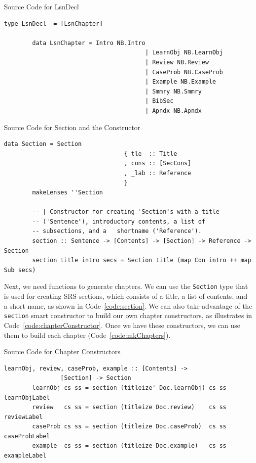 \begin{listing}[h]
	\caption{Source Code for LsnDecl}
	\label{code:LsnDecl}
	\begin{lstlisting}[language=haskell1]
		type LsnDecl  = [LsnChapter]
		
		data LsnChapter = Intro NB.Intro
										| LearnObj NB.LearnObj
										| Review NB.Review
										| CaseProb NB.CaseProb
										| Example NB.Example
										| Smmry NB.Smmry
										| BibSec
										| Apndx NB.Apndx
	\end{lstlisting}
\end{listing}

\begin{listing}[h!]
	\caption{Source Code for Section and the Constructor}
	\label{code:section}
	\begin{lstlisting}[language=haskell1]
		data Section = Section
								  { tle  :: Title
								  , cons :: [SecCons]
								  , _lab :: Reference
								  }
		makeLenses ''Section
		
		-- | Constructor for creating 'Section's with a title 
		-- ('Sentence'), introductory contents, a list of 
		-- subsections, and a	shortname ('Reference').
		section :: Sentence -> [Contents] -> [Section] -> Reference -> Section
		section title intro secs = Section title (map Con intro ++ map Sub secs)
	\end{lstlisting}
\end{listing}

Next, we need functions to generate chapters. We can use the \texttt{Section} 
type that is used for creating SRS sections, which consists of a title, a list 
of contents, and a short name, as shown in Code~\ref{code:section}. We can also 
take advantage of the \texttt{section} smart constructor to build our own 
chapter constructors, as illustrates in Code~\ref{code:chapterConstructor}. 
Once we have these constructors, we can use them to build each chapter 
(Code~\ref{code:mkChapters}).

\begin{listing}[h!]
	\caption{Source Code for Chapter Constructors} 
	\label{code:chapterConstructor}
	\begin{lstlisting}[language=haskell1]
		learnObj, review, caseProb, example :: [Contents] -> 
				[Section] -> Section
		learnObj cs ss = section (titleize' Doc.learnObj) cs ss learnObjLabel
		review   cs ss = section (titleize Doc.review)    cs ss reviewLabel
		caseProb cs ss = section (titleize Doc.caseProb)  cs ss caseProbLabel
		example  cs ss = section (titleize Doc.example)   cs ss exampleLabel
	\end{lstlisting}
\end{listing}

